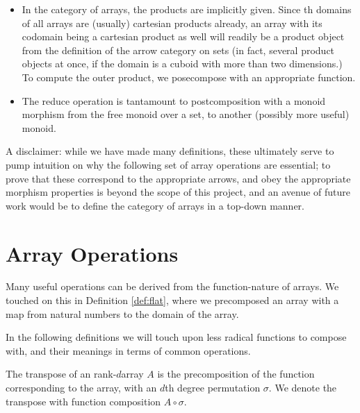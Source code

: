 \documentclass{DIKU-report-variant}
\begin{document}
\begin{observation}
  \label{ob:category-of-arrays}

  \begin{itemize}
    \item In the category of arrays, the products are implicitly given. Since th domains
      of all arrays are (usually) cartesian products already, an array with its codomain being
      a cartesian product as well will readily be a product object from the definition of
      the arrow category on sets (in fact, several product objects
      at once, if the domain is a cuboid with more than two dimensions.) To compute the outer
      product, we posecompose with an appropriate function.

    \item The reduce operation is tantamount to postcomposition with a
      monoid morphism from the free monoid over a set, to another (possibly more useful) monoid.
  \end{itemize}
\end{observation}

A disclaimer: while we have made many definitions, these ultimately
serve to pump intuition on why the following set of array operations
are essential; to prove that these correspond to the appropriate arrows,
and obey the appropriate morphism properties is beyond the scope of this
project, and an avenue of future work would be to define the category of
arrays in a top-down manner.

\section{Array Operations}
\label{sec:array-operations}

\begin{remark}
  \label{rem:functions}
  Many useful operations can be derived from the function-nature of arrays. We touched
  on this in Definition \ref{def:flat}, where we precomposed an array with a map
  from natural numbers to the domain of the array.

  In the following definitions we will touch upon less radical functions
  to compose with, and their meanings in terms of common operations.
\end{remark}

\begin{definition}
  \label{def:transpose}
  The transpose of an rank-\(d\)array \(A\) is the precomposition
  of the function corresponding to the array, with an \(d\)th degree permutation \(\sigma\).
  We denote the transpose with function composition \(A \circ \sigma\).
\end{definition}
\end{document}
